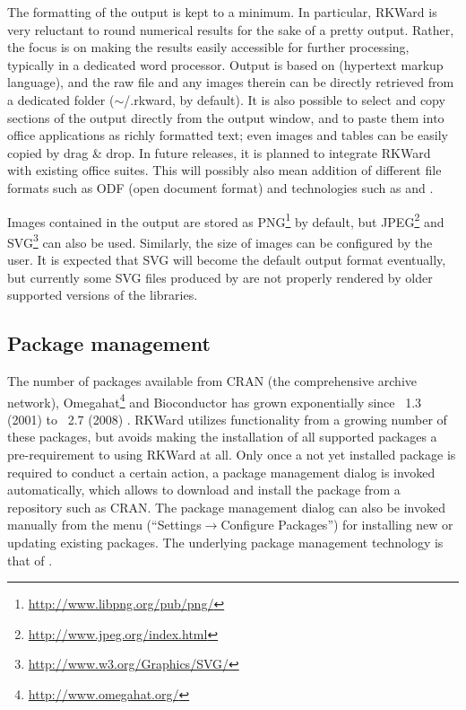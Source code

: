 The formatting of the output is kept to a minimum. In particular,
RKWard is very reluctant to round numerical results for the sake of a
pretty output. Rather, the focus is on making the results easily
accessible for further processing, typically in a dedicated word
processor. Output is based on
 (hypertext markup language), and the raw
 file and any images therein can be directly
retrieved from a dedicated folder
($\sim\!$/.rkward, by default). It is also
possible to select and copy sections of the output directly from the
output window, and to paste them into office applications as
richly formatted text; even images and tables can be easily copied by drag \& drop. In future releases, 
it is planned to integrate RKWard
with existing office suites. This
will possibly also mean addition of different file formats such as ODF (open
document format) and technologies such as  and 
\citep{Leisch2002, Kuhn2006}.

Images contained in the output are stored as
PNG\footnote{\url{http://www.libpng.org/pub/png/}} by
default, but JPEG\footnote{\url{http://www.jpeg.org/index.html}} and
SVG\footnote{\url{http://www.w3.org/Graphics/SVG/}}
can also be used. Similarly, the size of 
images can be configured by the user. It is expected that SVG will
become the default output format eventually, but currently some SVG
files produced by  are not properly
rendered by older supported versions of the
 libraries.

\subsection{Package management}
\label{sec:package_management}
The number of  packages available from CRAN (the comprehensive  archive
network), Omegahat\footnote{\url{http://www.omegahat.org/}} and Bioconductor \citep{Gentleman2004} has grown exponentially since \, 1.3
(2001) to \, 2.7 (2008) \citep{Fox2008, Ligges2003, Visne2009}. RKWard
utilizes functionality from a growing number of these packages, but avoids
making the installation of all supported packages a pre-requirement to using
RKWard at all. Only once a not yet installed package is required to conduct a certain
action, a package management dialog is invoked automatically, which allows to
download and install the package from a repository such as CRAN. The package
management dialog can also be invoked manually from the menu
(``Settings$\rightarrow$Configure Packages'') for installing new or updating existing 
packages. The underlying package management technology is that of 
\citep{Ligges2003, Ripley2005}.


